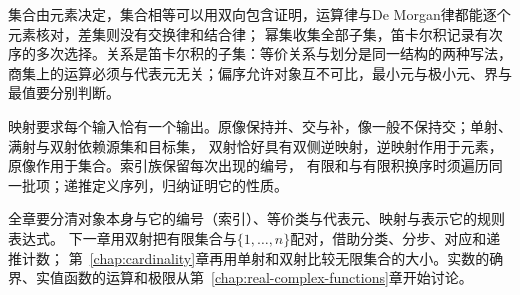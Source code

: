 集合由元素决定，集合相等可以用双向包含证明，运算律与De Morgan律都能逐个元素核对，差集则没有交换律和结合律；
幂集收集全部子集，笛卡尔积记录有次序的多次选择。关系是笛卡尔积的子集：等价关系与划分是同一结构的两种写法，
商集上的运算必须与代表元无关；偏序允许对象互不可比，最小元与极小元、界与最值要分别判断。

映射要求每个输入恰有一个输出。原像保持并、交与补，像一般不保持交；单射、满射与双射依赖源集和目标集，
双射恰好具有双侧逆映射，逆映射作用于元素，原像作用于集合。索引族保留每次出现的编号，
有限和与有限积换序时须遍历同一批项；递推定义序列，归纳证明它的性质。

全章要分清对象本身与它的编号（索引）、等价类与代表元、映射与表示它的规则表达式。
下一章用双射把有限集合与$\{1,\ldots,n\}$配对，借助分类、分步、对应和递推计数；
第~\ref{chap:cardinality}章再用单射和双射比较无限集合的大小。实数的确界、实值函数的运算和极限从第~\ref{chap:real-complex-functions}章开始讨论。
